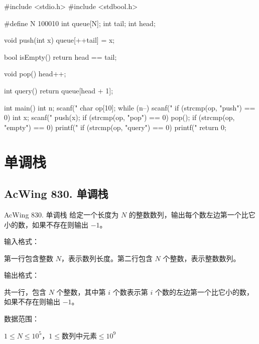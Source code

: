 \begin{mycpptwocol}[模拟队列]
    #include <stdio.h>
    #include <stdbool.h>

    #define N 100010
    int queue[N];
    int tail;
    int head;

    void push(int x) {
        queue[++tail] = x;
    }

    bool isEmpty() {
        return head == tail;
    }

    void pop() {
        head++;
    }

    int query() {
        return queue[head + 1];
    }

    int main() {
        int n;
        scanf("%
        char op[10];
        while (n--) {
            scanf("%
            if (strcmp(op, "push") == 0) {
                int x;
                scanf("%
                push(x);
            }
            if (strcmp(op, "pop") == 0) {
                pop();
            }
            if (strcmp(op, "empty") == 0) {
                printf("%
            }
            if (strcmp(op, "query") == 0) {
                printf("%
            }
        }
        return 0;
    }

\end{mycpptwocol}


\section{单调栈}

\subsection{AcWing 830. 单调栈}

\begin{titledbox}{AcWing 830. 单调栈}
    给定一个长度为 $N$ 的整数数列，输出每个数左边第一个比它小的数，如果不存在则输出 $-1$。

    输入格式：

    第一行包含整数 $N$，表示数列长度。第二行包含 $N$ 个整数，表示整数数列。

    输出格式：

    共一行，包含 $N$ 个整数，其中第 $i$ 个数表示第 $i$ 个数的左边第一个比它小的数，如果不存在则输出 $-1$。

    数据范围：

    $1 \le N \le 10^5$，$1 \le \text{数列中元素} \le 10^9$

    \begin{inputblock}
         \\
    \end{inputblock}
    \begin{outputblock}
    \end{outputblock}

\end{titledbox}


